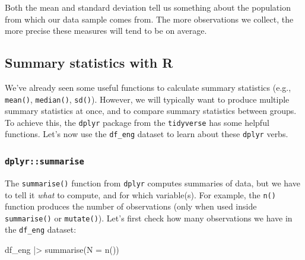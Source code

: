 \documentclass[
  letterpaper,
  DIV=11,
  numbers=noendperiod]{scrartcl}
\newenvironment{Shaded}{\begin{snugshade}}{\end{snugshade}}
\newcommand{\AttributeTok}[1]{\textcolor[rgb]{0.40,0.45,0.13}{#1}}
\newcommand{\FunctionTok}[1]{\textcolor[rgb]{0.28,0.35,0.67}{#1}}
\newcommand{\NormalTok}[1]{\textcolor[rgb]{0.00,0.23,0.31}{#1}}
\newcommand{\SpecialCharTok}[1]{\textcolor[rgb]{0.37,0.37,0.37}{#1}}
\begin{document}
\begin{tcolorbox}
\end{tcolorbox}

\begin{tcolorbox}[enhanced jigsaw, colframe=quarto-callout-tip-color-frame, rightrule=.15mm, breakable, coltitle=black, opacityback=0, leftrule=.75mm, colback=white, toprule=.15mm, opacitybacktitle=0.6, colbacktitle=quarto-callout-tip-color!10!white, bottomrule=.15mm, toptitle=1mm, left=2mm, titlerule=0mm, arc=.35mm, title=\textcolor{quarto-callout-tip-color}{\faLightbulb}\hspace{0.5em}{Population properties}, bottomtitle=1mm]

Both the mean and standard deviation tell us something about the
population from which our data sample comes from. The more observations
we collect, the more precise these measures will tend to be on average.

\end{tcolorbox}

\hypertarget{summary-statistics-with-r}{%
\subsection{Summary statistics with R}\label{summary-statistics-with-r}}

We've already seen some useful functions to calculate summary statistics
(e.g., \texttt{mean()}, \texttt{median()}, \texttt{sd()}). However, we
will typically want to produce multiple summary statistics at once, and
to compare summary statistics between groups. To achieve this, the
\texttt{dplyr} package from the \texttt{tidyverse} has some helpful
functions. Let's now use the \texttt{df\_eng} dataset to learn about
these \texttt{dplyr} verbs.

\hypertarget{dplyrsummarise}{%
\subsubsection{\texorpdfstring{\texttt{dplyr::summarise}}{dplyr::summarise}}\label{dplyrsummarise}}

The \texttt{summarise()} function from \texttt{dplyr} computes summaries
of data, but we have to tell it \emph{what} to compute, and for which
variable(s). For example, the \texttt{n()} function produces the number
of observations (only when used inside \texttt{summarise()} or
\texttt{mutate()}). Let's first check how many observations we have in
the \texttt{df\_eng} dataset:

\begin{Shaded}
\begin{Highlighting}[]
\NormalTok{df\_eng }\SpecialCharTok{|\textgreater{}}
  \FunctionTok{summarise}\NormalTok{(}\AttributeTok{N =} \FunctionTok{n}\NormalTok{())}
\end{Highlighting}
\end{Shaded}
\end{document}
